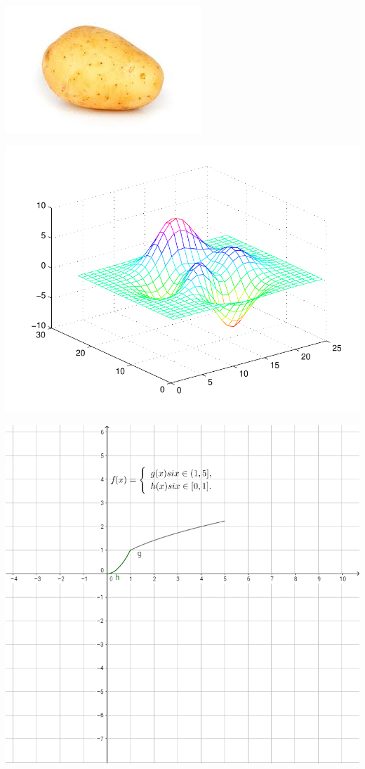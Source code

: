 \documentclass[a4paper,12pt]{article}
\begin{document}
\begin{center}
 \includegraphics[scale=2]{papa}
\end{center}

\begin{center}
 \includegraphics[scale=0.5,width=15cm,angle=65]{figura1.pdf}
\end{center}
\includegraphics[scale=0.7]{figura2}
\end{document}
